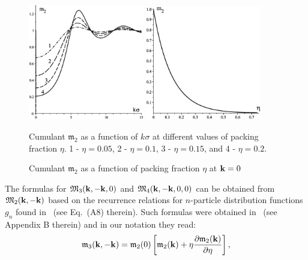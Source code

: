 \begin{figure}[htbp]
	\includegraphics[width=0.45\textwidth,angle=0]{M2_as_function_of_k_at_different_eta2} \hfill
	\includegraphics[width=0.45\textwidth,angle=0]{M2_as_function_of_eta_at_k_equals_0} \\
	\parbox{0.5\textwidth}{\caption{\label{m2_vs_k} Cumulant $\mathfrak{m}_2$ as a function of $k\sigma$ at different values of packing fraction $\eta$. 1 - $\eta = 0.05$, 2 - $\eta=0.1$, 3 - $\eta = 0.15$, and 4 - $\eta=0.2$.
	}} \hfill
	\parbox{0.45\textwidth}{\caption{\label{m2_vs_eta} Cumulant $\mathfrak{m}_2$ as a function of packing fraction $\eta$ at $\vb k = 0$
	}}
\end{figure}

The formulas for $\mathfrak{M}_3(\vb k, -\vb k, 0)$ and $\mathfrak{M}_4(\vb k, -\vb k, 0, 0)$ can be obtained from $\mathfrak{M}_2(\vb k, -\vb k)$ based on the recurrence relations for $n$-particle distribution functions $g_n$ found in~\cite{Schofield1966} (see Eq.~(A8) therein). Such formulas were obtained in~\cite{YukhJSP1995} (see Appendix B therein) and in our notation they read:
\begin{equation}
	\label{recur_m3_m2}
	\mathfrak{m}_3(\vb k, -\vb k) = \mathfrak{m}_2(0) 
	\left[
	\mathfrak{m}_2(\vb k) + \eta\frac{\partial\mathfrak{m}_2(\vb k)}{\partial\eta}
	\right],
\end{equation}


